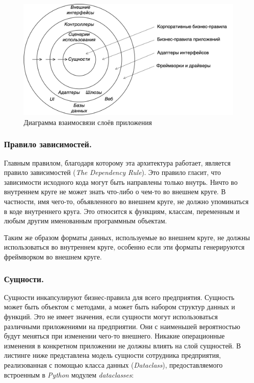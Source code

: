 \begin{figure}[h]
\centering
    \includegraphics[width=0.9\linewidth]{assets/clean-architecture-diagram.png}
    \caption{Диаграмма взаимосвязи слоёв приложения}
    \label{fig:clean-architecture-diagram}
\end{figure}

\subsubsection{Правило зависимостей. }

Главным правилом, благодаря которому эта архитектура работает, является правило зависимостей (\textit{The Dependency Rule}). Это правило гласит, что зависимости исходного кода могут быть направлены только внутрь. Ничто во внутреннем круге не может знать что-либо о чем-то во внешнем круге. В частности, имя чего-то, объявленного во внешнем круге, не должно упоминаться в коде внутреннего круга. Это относится к функциям, классам, переменным и любым другим именованным программным объектам.

Таким же образом форматы данных, используемые во внешнем круге, не должны использоваться во внутреннем круге, особенно если эти форматы генерируются фреймворком во внешнем круге.

\subsubsection{Сущности. }

Сущности инкапсулируют бизнес-правила для всего предприятия. Сущность может быть объектом с методами, а может быть набором структур данных и функций. Это не имеет значения, если сущности могут использоваться различными приложениями на предприятии. Они с наименьшей вероятностью будут меняться при изменении чего-то внешнего. Никакие операционные изменения в конкретном приложении не должны влиять на слой сущностей. В листинге ниже представлена модель сущности сотрудника предприятия, реализованная с помощью класса данных (\textit{Dataclass}), предоставляемого встроенным в \textit{Python} модулем \textit{dataclasses}:

